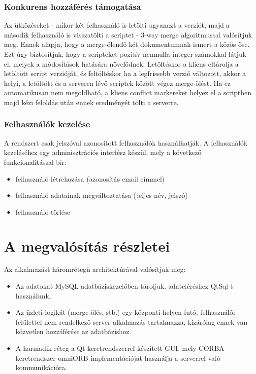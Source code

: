 \documentclass[a4paper,12pt]{article}
\begin{document}
\subsubsection{Konkurens hozzáférés támogatása}

Az ütközéseket - mikor két felhasználó is letölti ugyanazt a verziót, majd a
második felhasználó is visszatölti a scriptet - 3-way merge algoritmussal
valósítjuk meg. Ennek alapja, hogy a merge-ölendő két dokumentumnak ismert a
közös őse. Ezt úgy biztosítjuk, hogy a scripteket pozitív nemnulla integer
számokkal látjuk el, melyek a módosítások hatására növelődnek. Letöltéskor a
kliens eltárolja a letöltött script verzióját, és feltöltéskor ha a legfrissebb
verzió változott, akkor a helyi, a letöltött és a serveren lévő scriptek között
végez merge-ölést. Ha ez automatikusan nem megoldható, a kliens conflict
markereket helyez el a scriptben majd kézi feloldás után ennek eredményét tölti
a serverre.

\subsubsection{Felhasználók kezelése}

A rendszert csak jelszóval azonosított felhasználók használhatják. A
felhasználók kezeléséhez egy adminisztrációs interfész készül, mely a következő
funkcionalitással bír:

\begin{itemize}
\item felhasználó létrehozása (azonosítás email címmel)
\item felhasználó adatainak megváltoztatása (teljes név, jelszó)
\item felhasználó törlése
\end{itemize}

\section{A megvalósítás részletei}

Az alkalmazást háromrétegű architektúrával valósítjuk meg:

\begin{itemize}
\item Az adatokat MySQL adatbáziskezelőben tároljuk, adateléréshez QtSql-t használunk.
\item Az üzleti logikát (merge-ölés, stb.) egy központi helyen futó, felhasználói
felülettel nem rendelkező server alkalmazás tartalmazza, kizárólag ennek van
közvetlen hozzáférése az adatbázishoz.
\item A harmadik réteg a Qt keretrendszerrel készített GUI, mely CORBA
keretrendszer omniORB implementációját használja a serverrel való kommunikációra.
\end{itemize}
\end{document}
